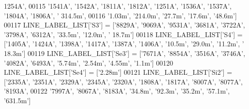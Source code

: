 \begin{DoxyCode}
{{{      1254A'}, 
00115                          \textcolor{stringliteral}{'1541A'}, \textcolor{stringliteral}{'1542A'}, \textcolor{stringliteral}{'1811A'}, \textcolor{stringliteral}{'1812A'}, \textcolor{stringliteral}{'1251A'}, \textcolor{stringliteral}{'1536A'}, \textcolor{stringliteral}{'1537A'}, \textcolor{stringliteral}{'1804A'}, \textcolor{stringliteral}{'1806A'}, \textcolor{stringliteral}{'
      314.5m'}, 
00116                          \textcolor{stringliteral}{'1.03m'}, \textcolor{stringliteral}{'214.0m'}, \textcolor{stringliteral}{'27.7m'}, \textcolor{stringliteral}{'17.6m'}, \textcolor{stringliteral}{'48.6m'}]
00117 LINE\_LABEL\_LIST[\textcolor{stringliteral}{'S3'}] = [\textcolor{stringliteral}{'8829A'}, \textcolor{stringliteral}{'9069A'}, \textcolor{stringliteral}{'9531A'}, \textcolor{stringliteral}{'3681A'}, \textcolor{stringliteral}{'3722A'}, \textcolor{stringliteral}{'3798A'}, \textcolor{stringliteral}{'6312A'}, \textcolor{stringliteral}{'33.5m'}, \textcolor{stringliteral}{'12.0m'}, \textcolor{stringliteral}{'
      18.7m'}]
00118 LINE\_LABEL\_LIST[\textcolor{stringliteral}{'S4'}] = [\textcolor{stringliteral}{'1405A'}, \textcolor{stringliteral}{'1424A'}, \textcolor{stringliteral}{'1398A'}, \textcolor{stringliteral}{'1417A'}, \textcolor{stringliteral}{'1387A'}, \textcolor{stringliteral}{'1406A'}, \textcolor{stringliteral}{'10.5m'}, \textcolor{stringliteral}{'29.0m'}, \textcolor{stringliteral}{'11.2m'}, \textcolor{stringliteral}{'
      18.3m'}]
00119 LINE\_LABEL\_LIST[\textcolor{stringliteral}{'Se3'}] = [\textcolor{stringliteral}{'7671A'}, \textcolor{stringliteral}{'8854A'}, \textcolor{stringliteral}{'3516A'}, \textcolor{stringliteral}{'3746A'}, \textcolor{stringliteral}{'4082A'}, \textcolor{stringliteral}{'6493A'}, \textcolor{stringliteral}{'5.74m'}, \textcolor{stringliteral}{'2.54m'}, \textcolor{stringliteral}{'4.55m'}, \textcolor{stringliteral}{
      '1.1m'}]
00120 LINE\_LABEL\_LIST[\textcolor{stringliteral}{'Se4'}] = [\textcolor{stringliteral}{'2.28m'}]
00121 LINE\_LABEL\_LIST[\textcolor{stringliteral}{'Si2'}] = [\textcolor{stringliteral}{'2335A'}, \textcolor{stringliteral}{'2351A'}, \textcolor{stringliteral}{'2329A'}, \textcolor{stringliteral}{'2345A'}, \textcolor{stringliteral}{'2320A'}, \textcolor{stringliteral}{'1808A'}, \textcolor{stringliteral}{'1817A'}, \textcolor{stringliteral}{'8007A'}, \textcolor{stringliteral}{'8077A'}, \textcolor{stringliteral}{
      '8193A'}, 
00122                           \textcolor{stringliteral}{'7997A'}, \textcolor{stringliteral}{'8067A'}, \textcolor{stringliteral}{'8183A'}, \textcolor{stringliteral}{'34.8m'}, \textcolor{stringliteral}{'92.3m'}, \textcolor{stringliteral}{'35.2m'}, \textcolor{stringliteral}{'57.1m'}, \textcolor{stringliteral}{'631.5m'}]
}}
\end{DoxyCode}
